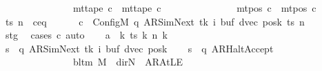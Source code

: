 \begin{isabellebody}
\ \ \ \ \ \ \ \ \ \ \ \ \ \ {\isasymand}\ mt{\isacharunderscore}{\kern0pt}tape\ c{\isacharprime}{\kern0pt}{\isacharprime}{\kern0pt}\ {\isacharequal}{\kern0pt}\ mt{\isacharunderscore}{\kern0pt}tape\ c{\isacharprime}{\kern0pt}\isanewline
\ \ \ \ \ \ \ \ \ \ \ \ \ \ {\isasymand}\ mt{\isacharunderscore}{\kern0pt}pos\ c{\isacharprime}{\kern0pt}{\isacharprime}{\kern0pt}\ {\isacharequal}{\kern0pt}\ mt{\isacharunderscore}{\kern0pt}pos\ c{\isacharprime}{\kern0pt}{\isachardoublequoteclose}\isanewline
%
\isadelimproof
%
\endisadelimproof
%
\isatagproof
{}\isamarkupfalse%
\ {\isacharminus}{\kern0pt}\isanewline
\ \ \isamarkupfalse%
\ ts\ n\ \ c{\isacharprime}{\kern0pt}{\isacharunderscore}{\kern0pt}eq{\isacharcolon}{\kern0pt}\isanewline
\ \ \ \ \ \ {\isachardoublequoteopen}c{\isacharprime}{\kern0pt}\ {\isacharequal}{\kern0pt}\ Config\isactrlsub M\ {\isacharparenleft}{\kern0pt}q{\isacharcomma}{\kern0pt}\ AR{\isacharunderscore}{\kern0pt}SimNext{\isacharcomma}{\kern0pt}\ tk{\isacharcomma}{\kern0pt}\ i{\isacharcomma}{\kern0pt}\ buf{\isacharcomma}{\kern0pt}\ dvec{\isacharcomma}{\kern0pt}\ posk{\isacharparenright}{\kern0pt}\ ts\ n{\isachardoublequoteclose}\isanewline
\ \ \ \ \isamarkupfalse%
\ stg\ \isamarkupfalse%
\ {\isacharparenleft}{\kern0pt}cases\ c{\isacharprime}{\kern0pt}{\isacharparenright}{\kern0pt}\ auto\isanewline
\ \ \isamarkupfalse%
\ {\isacharquery}{\kern0pt}a\ {\isacharequal}{\kern0pt}\ {\isachardoublequoteopen}{\isasymlambda}k{\isachardot}{\kern0pt}\ ts\ k\ {\isacharparenleft}{\kern0pt}n\ k{\isacharparenright}{\kern0pt}{\isachardoublequoteclose}\isanewline
\ \ \isamarkupfalse%
\ {\isacharquery}{\kern0pt}s\ {\isacharequal}{\kern0pt}\ {\isachardoublequoteopen}{\isacharparenleft}{\kern0pt}q{\isacharcomma}{\kern0pt}\ AR{\isacharunderscore}{\kern0pt}SimNext{\isacharcomma}{\kern0pt}\ tk{\isacharcomma}{\kern0pt}\ i{\isacharcomma}{\kern0pt}\ buf{\isacharcomma}{\kern0pt}\ dvec{\isacharcomma}{\kern0pt}\ posk{\isacharparenright}{\kern0pt}{\isachardoublequoteclose}\isanewline
\ \ \isamarkupfalse%
\ {\isacharquery}{\kern0pt}s{\isacharprime}{\kern0pt}\ {\isacharequal}{\kern0pt}\ {\isachardoublequoteopen}{\isacharparenleft}{\kern0pt}q{\isacharcomma}{\kern0pt}\ AR{\isacharunderscore}{\kern0pt}HaltAccept{\isacharcomma}{\kern0pt}\ {}{\isacharcomma}{\kern0pt}\ {}{\isacharcomma}{\kern0pt}\isanewline
\ \ \ \ \ \ \ \ \ \ \ \ \ \ {\isacharparenleft}{\kern0pt}{\isasymlambda}{\isacharunderscore}{\kern0pt}{\isachardot}{\kern0pt}\ bl{\isacharunderscore}{\kern0pt}tm\ M{\isacharparenright}{\kern0pt}{\isacharcomma}{\kern0pt}\ {\isacharparenleft}{\kern0pt}{\isasymlambda}{\isacharunderscore}{\kern0pt}{\isachardot}{\kern0pt}\ dir{\isachardot}{\kern0pt}N{\isacharparenright}{\kern0pt}{\isacharcomma}{\kern0pt}\ {\isacharparenleft}{\kern0pt}{\isasymlambda}{\isacharunderscore}{\kern0pt}{\isachardot}{\kern0pt}\ AR{\isacharunderscore}{\kern0pt}AtLE{\isacharparenright}{\kern0pt}{\isacharparenright}{\kern0pt}{\isachardoublequoteclose}\isanewline

\end{isabellebody}
